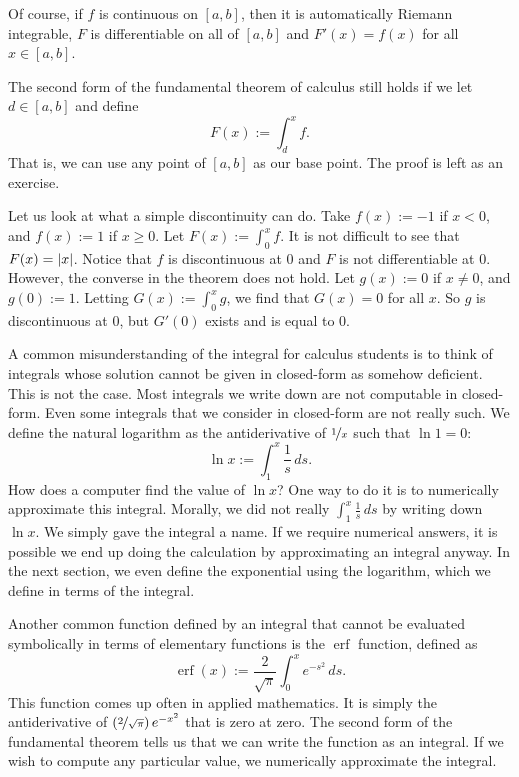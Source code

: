 Of course, if $f$ is continuous on $[a,b]$, then it is automatically Riemann
integrable, $F$ is differentiable on all of $[a,b]$ and $F'(x) = f(x)$ for
all $x \in [a,b]$.

\begin{remark} \label{remark:fundthmbase}
The second form of the fundamental theorem of calculus still holds if
we let $d \in [a,b]$ and define
\begin{equation*}
F(x) := \int_d^x f .
\end{equation*}
That is, we can use any point of $[a,b]$ as our base point.  The proof is
left as an exercise.
\end{remark}

Let us look at what a simple discontinuity can do.  Take $f(x) := -1$ if $x
< 0$, and $f(x) := 1$ if $x \geq 0$.  Let $F(x) := \int_0^x f$.  It is not
difficult to see that $F(x) = \left\lvert {x} \right\rvert$.  Notice that $f$ is discontinuous at
$0$ and $F$ is not differentiable at $0$.  However, the converse in the
theorem does not
hold.
Let $g(x) := 0$ if $x \not= 0$, and $g(0) := 1$.  Letting $G(x) :=
\int_0^x g$, we find that $G(x) = 0$ for all $x$.  So $g$ is discontinuous
at $0$, but $G'(0)$ exists and is equal to 0.

A common misunderstanding of the integral for calculus students is to
think of integrals whose solution cannot be given in closed-form as somehow
deficient.  This is not the case.  Most integrals we write down are not
computable in closed-form.  Even some integrals that we consider
in closed-form are not really such.  We define
the natural logarithm as the antiderivative of $\nicefrac{1}{x}$
such that $\ln 1 = 0$:
\begin{equation*}
\ln x := \int_1^x \frac{1}{s}\,ds .
\end{equation*}
How does a computer find the value of $\ln x$?
One way to do it is to numerically approximate this integral.
Morally,
we did not really  $\int_1^x \frac{1}{s}\,ds$ by
writing down $\ln x$.  We simply gave the integral a name.
If we require numerical answers,
it is possible we end up doing
the calculation by approximating an integral anyway.
In the next section, we even define the exponential using
the logarithm, which we define in terms of the integral.

Another common function defined by an integral that cannot
be evaluated symbolically in terms of elementary functions
is the $\operatorname{erf}$ function, defined as
\begin{equation*}
\operatorname{erf}(x) := \frac{2}{\sqrt{\pi}} \int_0^x e^{-s^2} \,ds .
\end{equation*}
This function comes up often in applied mathematics.  It is simply 
the antiderivative of $\left(\nicefrac{2}{\sqrt{\pi}}\right) e^{-x^2}$
that is zero at zero.
The second form of the fundamental theorem tells us that we can write the function
as an integral.  If we wish to compute any particular value, we 
numerically approximate the integral.

